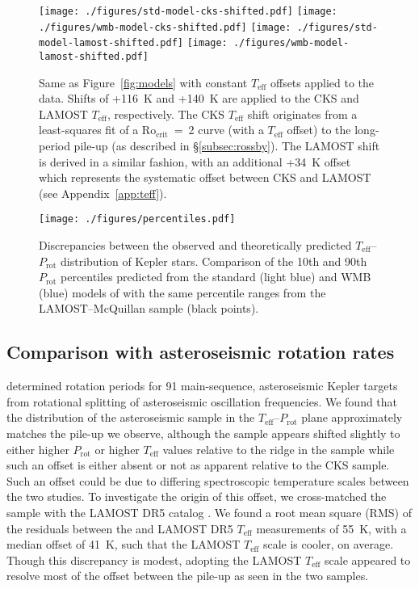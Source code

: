 \documentclass[linenumbers,trackchanges,twocolumn]{aastex631}
\newcommand{\rocrit}{$\mathrm{Ro_{crit}}$\xspace}
\newcommand{\lamostmcq}{LAMOST--McQuillan\xspace}
\newcommand{\teff}{\ensuremath{T_{\mathrm{eff}}}\xspace}
\newcommand{\prot}{\ensuremath{P_\mathrm{rot}}\xspace}
\begin{document}
\begin{figure*}
    \centering 
    \texttt{[image: ./figures/std-model-cks-shifted.pdf]}
    \texttt{[image: ./figures/wmb-model-cks-shifted.pdf]}
    \texttt{[image: ./figures/std-model-lamost-shifted.pdf]}
    \texttt{[image: ./figures/wmb-model-lamost-shifted.pdf]}
    \caption{Same as Figure~\ref{fig:models} with constant \teff offsets applied to the data. Shifts of +116~K and +140~K are applied to the CKS and LAMOST \teff, respectively. The CKS \teff shift originates from a least-squares fit of a \rocrit~=~2 curve (with a \teff offset) to the long-period pile-up (as described in \S\ref{subsec:rossby}). The LAMOST shift is derived in a similar fashion, with an additional +34~K offset which represents the systematic offset between CKS and LAMOST (see Appendix~\ref{app:teff}).}
    \label{fig:shifted}
\end{figure*}


\begin{figure}
    \centering
    \texttt{[image: ./figures/percentiles.pdf]}
    \caption{Discrepancies between the observed and theoretically predicted \teff--\prot distribution of Kepler stars. Comparison of the 10th and 90th \prot percentiles predicted from the standard (light blue) and WMB (blue) models of \citet{vanSaders2019} with the same percentile ranges from the LAMOST--McQuillan sample (black points).}
    \label{fig:percentiles}
\end{figure}

\subsection{Comparison with asteroseismic rotation rates}
\label{subsec:asteroseismic}

\citet{Hall2021} determined rotation periods for 91 main-sequence, asteroseismic Kepler targets from rotational splitting of asteroseismic oscillation frequencies. We found that the distribution of the asteroseismic sample in the \teff--\prot plane approximately matches the pile-up we observe, although the \citet{Hall2021} sample appears shifted slightly to either higher \prot or higher \teff values relative to the ridge in the \edit1{\lamostmcq} sample while such an offset is either absent or not as apparent relative to the CKS sample. Such an offset could be due to differing spectroscopic temperature scales between the two studies. To investigate the origin of this offset, we cross-matched the \citet{Hall2021} sample with the LAMOST DR5 catalog \citep{Xiang2019}. We found a root mean square (RMS) of the residuals between the \citet{Hall2021} and LAMOST DR5 \teff measurements of 55~K, with a median offset of 41~K, such that the LAMOST \teff scale is cooler, on average. Though this discrepancy is modest, adopting the LAMOST \teff scale appeared to resolve most of the offset between the pile-up as seen in the two samples. 
\end{document}
